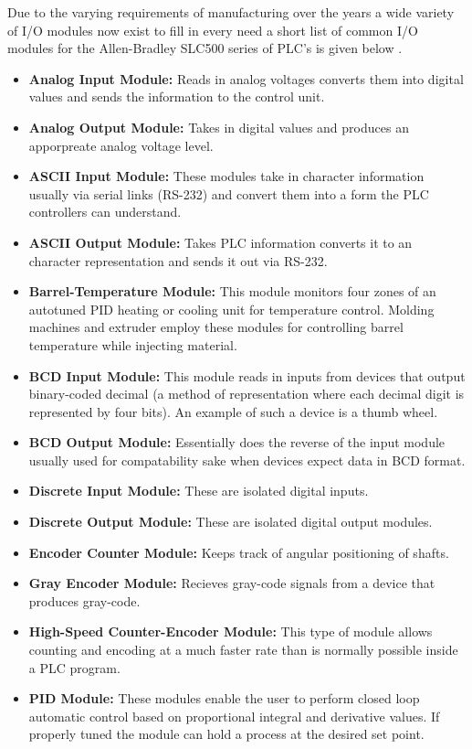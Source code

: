 Due to the varying requirements of manufacturing over the years a wide variety of I/O modules now exist to fill in every need a short list of common I/O modules for the Allen-Bradley SLC500 series of PLC's is given below \cite{slc500}.
\begin{itemize}
	\item \textbf{Analog Input Module:} Reads in analog voltages converts them into digital values and sends the information to the control unit.
	\item \textbf{Analog Output Module:} Takes in digital values and produces an apporpreate analog voltage level.
	\item \textbf{ASCII Input Module:} These modules take in character information usually via serial links (RS-232) and convert them into a form the PLC controllers can understand\cite{slc500}.
	\item \textbf{ASCII Output Module:} Takes PLC information converts it to an character representation and sends it out via RS-232.
	\item \textbf{Barrel-Temperature Module:} This module monitors four zones of an autotuned PID heating or cooling unit for temperature control. Molding machines and extruder employ these modules for controlling barrel temperature while injecting material\cite{slc500}.
	\item \textbf{BCD Input Module:} This module reads in inputs from devices that output binary-coded decimal (a method of representation where each decimal digit is represented by four bits). An example of such a device is a thumb wheel\cite{slc500}.
	\item \textbf{BCD Output Module:} Essentially does the reverse of the input module usually used for compatability sake when devices expect data in BCD format.
	\item \textbf{Discrete Input Module:} These are isolated digital inputs.
	\item \textbf{Discrete Output Module:} These are isolated digital output modules.
	\item \textbf{Encoder Counter Module:} Keeps track of angular positioning of shafts.
	\item \textbf{Gray Encoder Module:} Recieves gray-code signals from a device that produces gray-code.
	\item \textbf{High-Speed Counter-Encoder Module:} This type of module allows counting and encoding at a much faster rate than is normally possible inside a PLC program.
	\item \textbf{PID Module:} These modules enable the user to perform closed loop automatic control based on proportional integral and derivative values. If properly tuned the module can hold a process at the desired set point.

\end{itemize}
